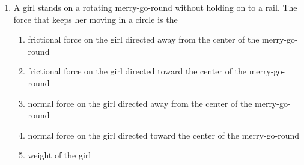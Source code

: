 \documentclass{../../../oss-apphys}
\begin{document}
\genheader


\genmultidirections

\gengravity

\raggedcolumns
\begin{multicols*}{2}
  \begin{enumerate}[leftmargin=18pt]
  \item A girl stands on a rotating merry-go-round without holding on to a rail.
    The force that keeps her moving in a circle is the
    \begin{enumerate}[nosep,leftmargin=18pt,label=(\Alph*)]
    \item frictional force on the girl directed away from the center of the
      merry-go-round
    \item frictional force on the girl directed toward the center of the
      merry-go-round
    \item normal force on the girl directed away from the center of the
      merry-go-round
    \item normal force on the girl directed toward the center of the
      merry-go-round
    \item weight of the girl
    \end{enumerate}
    
  \end{enumerate}
  

\end{multicols*}
\end{document}
